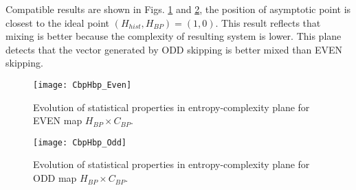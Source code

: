 Compatible results are shown in Figs. \ref{fig:EVEN_HC} and \ref{fig:ODD_HC}, the position of asymptotic point is closest to the ideal point $(H_{hist}, H_{BP})=(1, 0)$.
This result reflects that mixing is better because the complexity of resulting system is lower.
This plane detects that the vector generated by ODD skipping is better mixed than EVEN skipping.
 
\begin{figure}[htpb]
	\centering
	\texttt{[image: CbpHbp\_Even]}
	\caption{Evolution of statistical properties in entropy-complexity plane for EVEN map $H_{BP} \times C_{BP}$.}
	\label{fig:EVEN_HC}
\end{figure}

\begin{figure}[htpb]
	\centering
	\texttt{[image: CbpHbp\_Odd]}
	\caption{Evolution of statistical properties in entropy-complexity plane for ODD map $H_{BP} \times C_{BP}$.}
	\label{fig:ODD_HC}
\end{figure}